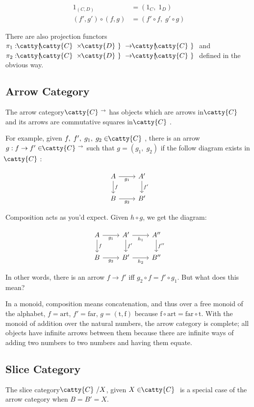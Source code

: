 \documentclass[]{article}
\newcommand{\cdr}[1]{\arrow[swap]{r}{#1}}
\newcommand{\cdd}[1]{\arrow{d}{#1}}
\newcommand{\tfarr}[3]{\ensuremath{#1 : #2 \to #3}}
\newcommand{\functor}[3]{\ensuremath{#1 : \cat{#2} \to \cat{#3}}}
\newcommand{\cat}[1]{\ensuremath{\!\! \catty{#1} \,\,}}
\begin{document}
\begin{align*}
  1_{(C, D)} &= (1_C, \; 1_D) \\
  (f', g') \circ (f, g) &= (f' \circ f, \; g' \circ g)
\end{align*}

There are also projection functors
$\functor{\pi_1}{\cat{C}\times\cat{D}}{\cat{C}}$ and
$\functor{\pi_2}{\cat{C}\times\cat{D}}{\cat{C}}$ defined in the obvious way.

\subsection{Arrow Category}

The arrow category $\cat{C}^\rightarrow$ has objects which are arrows in \cat{C}
and its arrows are commutative squares in \cat{C}.

For example, given $f,\;f',\;g_1,\;g_2 \in \cat{C}$, there is an arrow $\tfarr{g
}{f}{f'} \in \cat{C}^\rightarrow$ such that $g = (g_1,\;g_2)$ if the follow
diagram exists in \cat{C}:

$$\begin{tikzcd}
  A \cdr{g_1} \cdd{f} & A' \cdd{f'} \\
  B \cdr{g_2} & B'
\end{tikzcd}$$

Composition acts as you'd expect. Given $h \circ g$, we get the diagram:

$$\begin{tikzcd}
  A \cdr{g_1} \cdd{f} & A' \cdr{h_1} \cdd{f'} & A'' \cdd{f''}  \\
  B \cdr{g_2} & B' \cdr{h_2} & B''
\end{tikzcd}$$

In other words, there is an arrow $f\to f'$ iff $g_2\circ f = f' \circ g_1$. But
what does this mean?

In a monoid, composition means concatenation, and thus over a free monoid of the
alphabet, $f = \text{art}$, $f' = \text{far}$, $g = (\text{t}, \text{f})$
because $\text{f}\circ\text{art} = \text{far}\circ\text{t}$. With the monoid of
addition over the natural numbers, the arrow category is complete; all objects
have infinite arrows between them because there are infinite ways of adding two
numbers to two numbers and having them equate.


\subsection{Slice Category}

The slice category $\cat{C}/X$, given $X \in \cat{C}$ is a special case of the
arrow category when $B = B' = X$.
\end{document}
